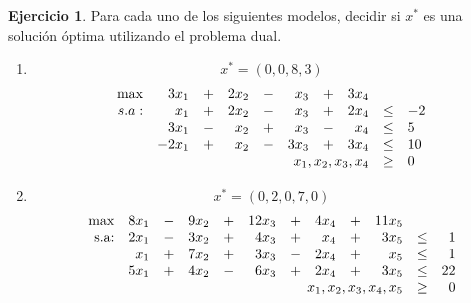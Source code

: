 \documentclass[12pt]{article}
\theoremstyle{definition}
\newtheorem{ejer}{Ejercicio}
\newcommand{\bej}{\begin{ejer}}
\newcommand{\fej}{\end{ejer}}
\begin{document}
\bej Para cada uno de los siguientes modelos, decidir si $x^\ast$ es una solución óptima utilizando el problema dual.
    \begin{enumerate}
        \item 
        \[x^\ast = (0, 0, 8, 3) \]
        \[
        \begin{array}{rrrrrrrrcl}
        \max & 3x_1&+&2x_2&-&x_3&+&3x_4 & &  \\
        s.a: & x_1&+&2x_2&-&x_3&+&2x_4 & \leq & -2 \\
         & 3x_1&-&x_2&+&x_3&-&x_4 & \leq & 5 \\
         & -2x_1&+&x_2&-&3x_3&+&3x_4 & \leq & 10 \\
         & \multicolumn{7}{r}{x_1,x_2,x_3,x_4} & \geq & 0
        \end{array}
        \]
        \item     
        \[x^\ast = (0, 2, 0, 7, 0)\]
        \[\begin{array}{rrrrrrrrrrrr}
        \max & 8x_1 & - & 9x_2 & + & 12x_3 & + & 4x_4 & + & 11x_5   \\
        \text{s.a:} & 2x_1 & - & 3x_2 & + &4x_3 & + & x_4 & + & 3x_5 & \leq & 1 \\
         & x_1 & + & 7x_2 & + &3x_3 & - & 2x_4 & + & x_5 & \leq & 1 \\
         & 5x_1 & + & 4x_2 & - & 6x_3 & + & 2x_4 & + & 3x_5 & \leq & 22 \\
         & \multicolumn{9}{r}{x_1,x_2,x_3,x_4,x_5} & \geq & 0
    \end{array}
    \]

    \end{enumerate}
\fej
\end{document}
